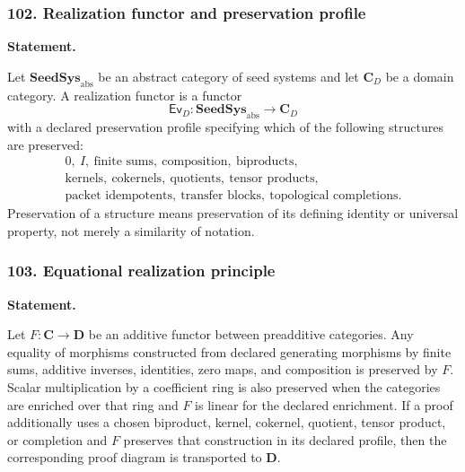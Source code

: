 \subsubsection*{102. Realization functor and preservation profile}
\label{rec:PSC-I-D-REALIZATION-FUNCTOR}
\textbf{Statement.}\par
Let $\mathbf{SeedSys}_{\mathrm{abs}}$ be an abstract category of seed systems and let $\mathbf C_D$ be a domain category.  A realization functor is a functor
\[
\mathsf{Ev}_D:\mathbf{SeedSys}_{\mathrm{abs}}\longrightarrow\mathbf C_D
\]
with a declared preservation profile specifying which of the following structures are preserved:
\[
\begin{gathered}
0,\ I,\ \text{finite sums},\ \text{composition},\ \text{biproducts},\\
\text{kernels},\ \text{cokernels},\ \text{quotients},\ \text{tensor products},\\
\text{packet idempotents},\ \text{transfer blocks},\ \text{topological completions}.
\end{gathered}
\]
Preservation of a structure means preservation of its defining identity or universal property, not merely a similarity of notation.
\subsubsection*{103. Equational realization principle}
\label{rec:PSC-I-T-REALIZATION-EXPORT}
\textbf{Statement.}\par
Let $F:\mathbf C\to\mathbf D$ be an additive functor between preadditive categories.  Any equality of morphisms constructed from declared generating morphisms by finite sums, additive inverses, identities, zero maps, and composition is preserved by $F$.  Scalar multiplication by a coefficient ring is also preserved when the categories are enriched over that ring and $F$ is linear for the declared enrichment.  If a proof additionally uses a chosen biproduct, kernel, cokernel, quotient, tensor product, or completion and $F$ preserves that construction in its declared profile, then the corresponding proof diagram is transported to $\mathbf D$.


